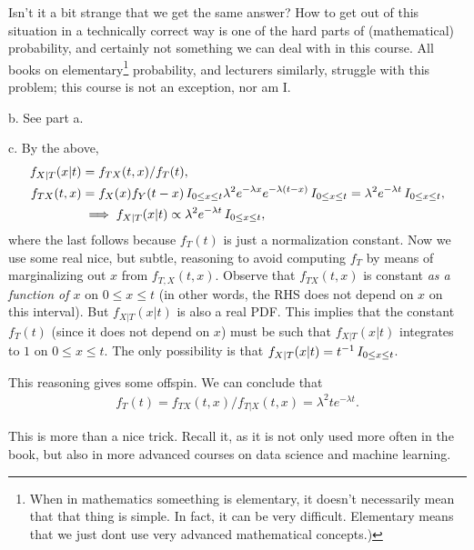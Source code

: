 \begin{exercise}
\begin{solution}
Isn't it a bit strange that we get the same answer?
How to get out of this situation in a technically correct way is one of the hard parts of (mathematical) probability, and certainly not something we can deal with  in this course.
All books on elementary\footnote{When  in mathematics someething is elementary, it doesn't necessarily mean that that thing is simple. In fact, it can be very difficult.  Elementary means that we just dont use very advanced mathematical concepts.)} probability, and lecturers similarly, struggle with this problem; this course is not an exception, nor am I.

b.  See  part a.

c. By the above,
\begin{align*}
  f_{X|T}(x|t) &= f_{TX}(t,x)/f_T(t), \\
f_{TX}(t,x)  &=  f_X(x)f_Y(t-x) \,I_{0\leq x \leq t} \lambda^2 e^{-\lambda x} e^{-\lambda(t-x)} \,I_{0\leq x\leq t} = \lambda^2e^{-\lambda t} \,I_{0\leq x\leq t},\\
  &\implies  f_{X|T}(x|t) \propto \lambda^2e^{-\lambda t} \,I_{0\leq x\leq t} ,
\end{align*}
where the last follows because $f_T(t)$ is just a normalization constant.
Now we use some real nice, but subtle, reasoning to avoid computing $f_T$ by means of marginalizing out $x$ from $f_{T,X}(t, x)$.  Observe that $f_{TX}(t, x)$ is constant \emph{as a function of $x$} on $0\leq x \leq t$ (in other words, the RHS does not depend on $x$ on this interval). But $f_{X|T}(x|t)$  is also a real PDF. This implies  that the constant $f_T(t)$ (since it does not depend on $x$) must be  such that  $f_{X|T}(x|t)$ integrates to $1$ on $0\leq x \leq t$. The only possibility is that $f_{X|T}(x|t) = t^{-1}\,I_{0\leq x \leq t}$.

This reasoning gives some  offspin.  We can conclude that
\begin{align*}
  f_T(t) = f_{TX}(t, x)/f_{T|X}(t,x) = \lambda^2 t e^{-\lambda t}.
\end{align*}

This is more than a nice trick. Recall it, as it is not only used more often in the book, but also in more advanced courses on data science and machine learning.
\end{solution}
\end{exercise}


